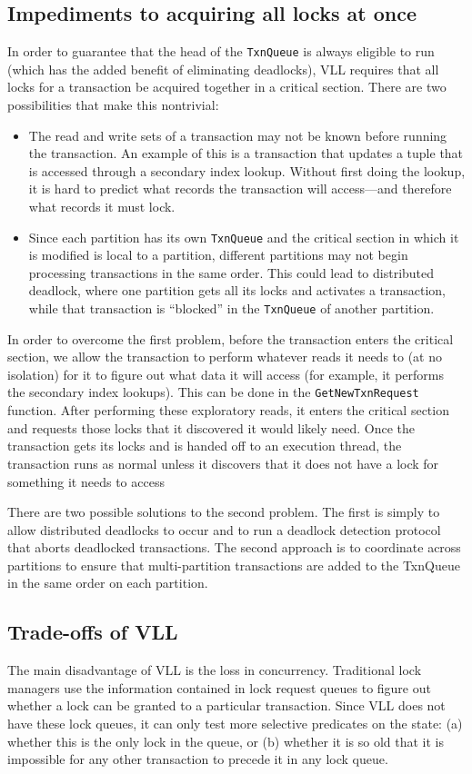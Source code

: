 \documentclass[11pt]{article}
\begin{document}
\subsection{Impediments to acquiring all locks at once}
\label{sec:org0a624be}
In order to guarantee that the head of the \texttt{TxnQueue} is always eligible to run (which has the added
benefit of eliminating deadlocks), VLL requires that all locks for a transaction be acquired together
in a critical section. There are two possibilities that make this nontrivial:
\begin{itemize}
\item The read and write sets of a transaction may not be known before running the transaction. An example
of this is a transaction that updates a tuple that is accessed through a secondary index lookup.
Without first doing the lookup, it is hard to predict what records the transaction will access—and
therefore what records it must lock.
\item Since each partition has its own \texttt{TxnQueue} and the critical section in which it is modified is local
to a partition, different partitions may not begin processing transactions in the same order. This
could lead to distributed deadlock, where one partition gets all its locks and activates a
transaction, while that transaction is “blocked” in the \texttt{TxnQueue} of another partition.
\end{itemize}

In order to overcome the first problem, before the transaction enters the critical section, we allow
the transaction to perform whatever reads it needs to (at no isolation) for it to figure out what data
it will access (for example, it performs the secondary index lookups). This can be done in the
\texttt{GetNewTxnRequest}  function. After performing these exploratory reads, it enters the critical section
and requests those locks that it discovered it would likely need. Once the transaction gets its locks
and is handed off to an execution thread, the transaction runs as normal unless it discovers that it
does not have a lock for something it needs to access

There are two possible solutions to the second problem. The first is simply to allow distributed
deadlocks to occur and to run a deadlock detection protocol that aborts deadlocked transactions. The
second approach is to coordinate across partitions to ensure that multi-partition transactions are
added to the TxnQueue in the same order on each partition.
\subsection{Trade-offs of VLL}
\label{sec:org4edd910}
The main disadvantage of VLL is the loss in concurrency. Traditional lock managers use the information
contained in lock request queues to figure out whether a lock can be granted to a particular
transaction. Since VLL does not have these lock queues, it can only test more selective predicates on
the state: (a) whether this is the only lock in the queue, or (b) whether it is so old that it is
impossible for any other transaction to precede it in any lock queue.
\end{document}
